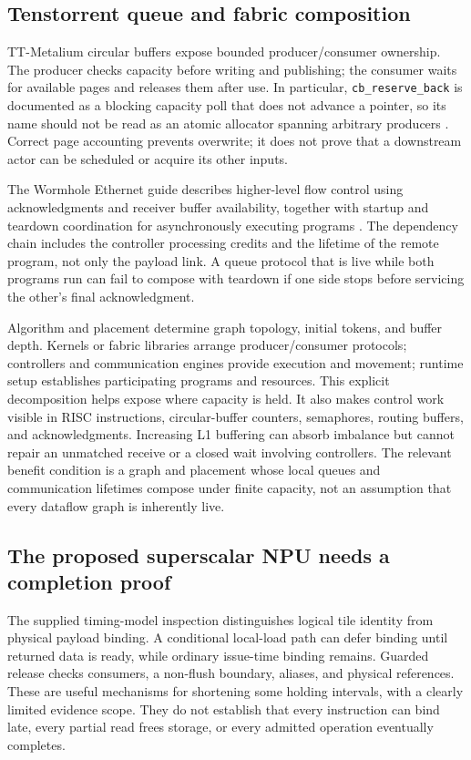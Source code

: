 \subsection{Tenstorrent queue and fabric composition}

TT-Metalium circular buffers expose bounded producer/consumer ownership. The producer checks capacity before writing and publishing; the consumer waits for available pages and releases them after use. In particular, \texttt{cb\_reserve\_back} is documented as a blocking capacity poll that does not advance a pointer, so its name should not be read as an atomic allocator spanning arbitrary producers \citep{u008_tt_cb,u008_tt_reserve,u008_tt_pop}. Correct page accounting prevents overwrite; it does not prove that a downstream actor can be scheduled or acquire its other inputs.

The Wormhole Ethernet guide describes higher-level flow control using acknowledgments and receiver buffer availability, together with startup and teardown coordination for asynchronously executing programs \citep{u007_tt_ethernet}. The dependency chain includes the controller processing credits and the lifetime of the remote program, not only the payload link. A queue protocol that is live while both programs run can fail to compose with teardown if one side stops before servicing the other's final acknowledgment.

Algorithm and placement determine graph topology, initial tokens, and buffer depth. Kernels or fabric libraries arrange producer/consumer protocols; controllers and communication engines provide execution and movement; runtime setup establishes participating programs and resources. This explicit decomposition helps expose where capacity is held. It also makes control work visible in RISC instructions, circular-buffer counters, semaphores, routing buffers, and acknowledgments. Increasing L1 buffering can absorb imbalance but cannot repair an unmatched receive or a closed wait involving controllers. The relevant benefit condition is a graph and placement whose local queues and communication lifetimes compose under finite capacity, not an assumption that every dataflow graph is inherently live.

\subsection{The proposed superscalar NPU needs a completion proof}

The supplied timing-model inspection distinguishes logical tile identity from physical payload binding. A conditional local-load path can defer binding until returned data is ready, while ordinary issue-time binding remains. Guarded release checks consumers, a non-flush boundary, aliases, and physical references. These are useful mechanisms for shortening some holding intervals, with a clearly limited evidence scope. They do not establish that every instruction can bind late, every partial read frees storage, or every admitted operation eventually completes.

